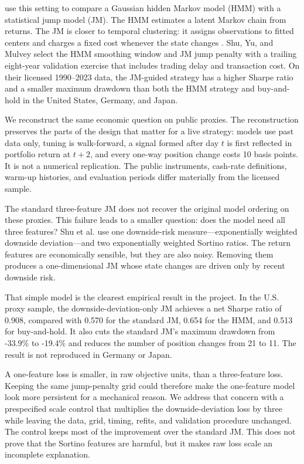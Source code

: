 \documentclass[11pt]{article}
\begin{document}
\citet{shu2024} use this setting to compare a Gaussian hidden Markov model (HMM) with a statistical jump model (JM). The HMM estimates a latent Markov chain from returns. The JM is closer to temporal clustering: it assigns observations to fitted centers and charges a fixed cost whenever the state changes \citep{bemporad2018,nystrup2020}. Shu, Yu, and Mulvey select the HMM smoothing window and JM jump penalty with a trailing eight-year validation exercise that includes trading delay and transaction cost. On their licensed 1990--2023 data, the JM-guided strategy has a higher Sharpe ratio and a smaller maximum drawdown than both the HMM strategy and buy-and-hold in the United States, Germany, and Japan.

We reconstruct the same economic question on public proxies. The reconstruction preserves the parts of the design that matter for a live strategy: models use past data only, tuning is walk-forward, a signal formed after day $t$ is first reflected in portfolio return at $t+2$, and every one-way position change costs 10 basis points. It is not a numerical replication. The public instruments, cash-rate definitions, warm-up histories, and evaluation periods differ materially from the licensed sample.

The standard three-feature JM does not recover the original model ordering on these proxies. This failure leads to a smaller question: does the model need all three features? Shu et al. use one downside-risk measure---exponentially weighted downside deviation---and two exponentially weighted Sortino ratios. The return features are economically sensible, but they are also noisy. Removing them produces a one-dimensional JM whose state changes are driven only by recent downside risk.

That simple model is the clearest empirical result in the project. In the U.S. proxy sample, the downside-deviation-only JM achieves a net Sharpe ratio of 0.908, compared with 0.570 for the standard JM, 0.654 for the HMM, and 0.513 for buy-and-hold. It also cuts the standard JM's maximum drawdown from -33.9\% to -19.4\% and reduces the number of position changes from 21 to 11. The result is not reproduced in Germany or Japan.

A one-feature loss is smaller, in raw objective units, than a three-feature loss. Keeping the same jump-penalty grid could therefore make the one-feature model look more persistent for a mechanical reason. We address that concern with a prespecified scale control that multiplies the downside-deviation loss by three while leaving the data, grid, timing, refits, and validation procedure unchanged. The control keeps most of the improvement over the standard JM. This does not prove that the Sortino features are harmful, but it makes raw loss scale an incomplete explanation.
\end{document}
